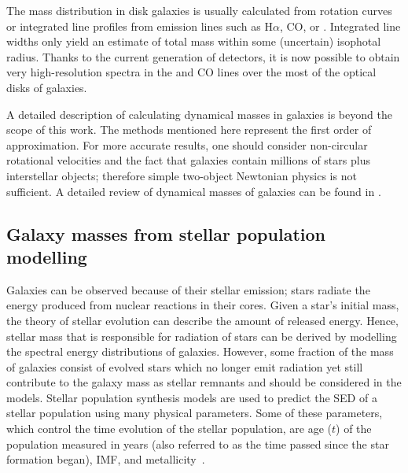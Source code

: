 The mass distribution in disk galaxies is usually calculated from rotation curves or integrated line profiles from emission lines such as H${\alpha}$, CO, or \hi. 
Integrated line widths only yield an estimate of total mass within some (uncertain) isophotal radius.
Thanks to the current generation of detectors, it is now possible to obtain very high-resolution spectra in the \halpha and CO lines over the most of the optical disks of galaxies.

A detailed description of calculating dynamical masses in galaxies is beyond the scope of this work. 
The methods mentioned here represent the first order of approximation. 
For more accurate results, one should consider non-circular rotational velocities and the fact that galaxies contain millions of stars plus interstellar objects; therefore simple two-object Newtonian physics is not sufficient. 
A detailed review of dynamical masses of galaxies can be found in \citet{Courteau13}.

\subsection{Galaxy masses from stellar population modelling}

Galaxies can be observed because of their stellar emission; stars radiate the energy produced from nuclear reactions in their cores. 
Given a star's initial mass, the theory of stellar evolution can describe the amount of released energy. 
Hence, stellar mass that is responsible for radiation of stars can be derived by modelling the spectral energy distributions of galaxies. 
However, some fraction of the mass of galaxies consist of evolved stars which no longer emit radiation yet still contribute to the galaxy mass as stellar remnants and should be considered in the models.
Stellar population synthesis models are used to predict the SED of a stellar population using many physical parameters. 
Some of these parameters, which control the time evolution of the stellar population, are age ($t$) of the population measured in years (also referred to as the time passed since the star formation began), IMF, and metallicity~\citep{Courteau13}.

